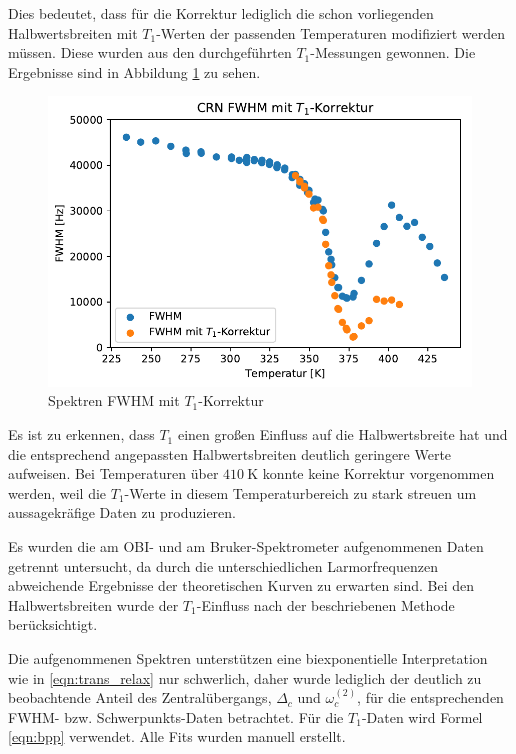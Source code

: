 Dies bedeutet, dass für die Korrektur lediglich die schon vorliegenden Halbwertsbreiten mit $T_1$-Werten der passenden Temperaturen modifiziert werden müssen. Diese wurden aus den durchgeführten $T_1$-Messungen gewonnen. Die Ergebnisse sind in Abbildung \ref{fig:res:spek_fwhm_t1} zu sehen.
\begin{figure}
	\begin{center}
		\includegraphics[width=\textwidth]{graphics/plots/SPEK/spek_t1korr.pdf}
	\end{center}
	\caption{Spektren FWHM mit $T_1$-Korrektur} \label{fig:res:spek_fwhm_t1}
\end{figure}

Es ist zu erkennen, dass $T_1$ einen großen Einfluss auf die Halbwertsbreite hat und die entsprechend angepassten Halbwertsbreiten deutlich geringere Werte aufweisen. Bei Temperaturen über $\SI{410}{\kelvin}$ konnte keine Korrektur vorgenommen werden, weil die $T_1$-Werte in diesem Temperaturbereich zu stark streuen um aussagekräfige Daten zu produzieren.






Es wurden die am OBI- und am Bruker-Spektrometer aufgenommenen Daten getrennt untersucht, da durch die unterschiedlichen Larmorfrequenzen abweichende Ergebnisse der theoretischen Kurven zu erwarten sind. Bei den Halbwertsbreiten wurde der $T_1$-Einfluss nach der beschriebenen Methode berücksichtigt.



Die aufgenommenen Spektren unterstützen eine biexponentielle Interpretation wie in \eqref{eqn:trans_relax} nur schwerlich, daher wurde lediglich der deutlich zu beobachtende Anteil des Zentralübergangs, $\Delta_c$ und $\omega_c^{(2)}$, für die entsprechenden FWHM- bzw. Schwerpunkts-Daten betrachtet. Für die $T_1$-Daten wird Formel \eqref{eqn:bpp} verwendet. Alle Fits wurden manuell erstellt.





